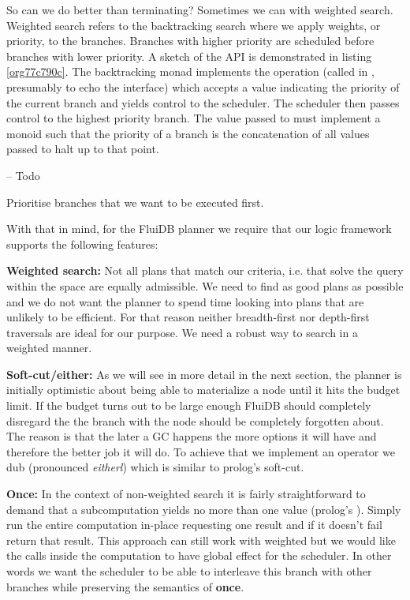 So can we do better than terminating? Sometimes we can with weighted
search. Weighted search refers to the backtracking search where we
apply weights, or priority, to the branches. Branches with higher
priority are scheduled before branches with lower priority. A sketch
of the API is demonstrated in listing \ref{org77c790c}. The
backtracking monad implements the  operation (called  in
\cite{kidneyAlgebrasWeightedSearch2021}, presumably to echo the
 interface) which accepts a value indicating the priority
of the current branch and yields control to the scheduler. The
scheduler then passes control to the highest priority branch. The
value passed to  must implement a monoid such that the priority
of a branch is the concatenation of all values passed to halt up to
that point.
\begin{code}
\begin{haskellcode}
-- Todo
\end{haskellcode}
\caption{\label{org77c790c}Prioritise branches that we want to be executed first.}
\end{code}

With that in mind, for the FluiDB planner we require that our logic
framework supports the following features:

\textbf{Weighted search:} Not all plans that match our criteria, i.e. that
solve the query within the space are equally admissible. We need to
find as good plans as possible and we do not want the planner to spend
time looking into plans that are unlikely to be efficient. For that
reason neither breadth-first nor depth-first traversals are ideal for
our purpose. We need a robust way to search in a weighted manner.

\textbf{Soft-cut/either:} As we will see in more detail in the next section,
the planner is initially optimistic about being able to materialize a
node until it hits the budget limit. If the budget turns out to be
large enough FluiDB should completely disregard the the branch with
the node should be completely forgotten about. The reason is that the
later a GC happens the more options it will have and therefore the
better job it will do. To achieve that we implement an operator we dub
\hask{<//>} (pronounced \emph{eitherl}) which is similar to prolog's soft-cut.

\textbf{Once:} In the context of non-weighted search it is fairly
straightforward to demand that a subcomputation yields no more than
one value (prolog's ). Simply run the entire computation
in-place requesting one result and if it doesn't fail return that
result. This approach can still work with weighted but we would like
the  calls inside the computation to have global effect for the
scheduler. In other words we want the scheduler to be able to
interleave this branch with other branches while preserving the
semantics of \textbf{once}.

